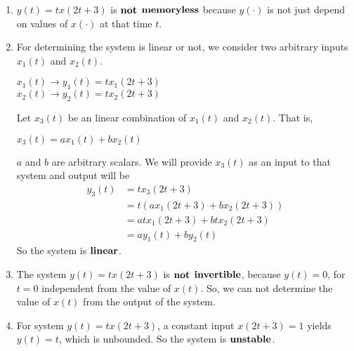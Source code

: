\documentclass[10pt,a4paper, margin=1in]{article}
\begin{document}
\begin{enumerate}
\begin{enumerate}
\begin{enumerate}
        \item
         $y(t)=tx(2t+3)$ is $\bold{not}$ $\bold{memoryless}$ because $y(\cdot)$ is not just depend on values of $x(\cdot)$ at that time $t$. 
         
        \item
        For determining the system is linear or not, we consider two arbitrary inputs $x_1(t)$ and $x_2(t)$.
        \begin{center}
            $x_1(t) \longrightarrow y_1(t) = tx_1(2t+3)$\\
            $x_2(t) \longrightarrow y_2(t) = tx_2(2t+3)$
        \end{center}
        Let $x_3(t)$ be an linear combination of $x_1(t)$ and $x_2(t)$. That is,
        \begin{center}
            $x_3(t) = ax_1(t) + bx_2(t)$  
        \end{center}
        $a$ and $b$ are arbitrary scalars. We will provide $x_3(t)$ as an input to that system and output will be 
        \begin{equation}
            \begin{split}
                y_3(t)  &= tx_3(2t+3)\\
                        &= t(ax_1(2t+3) + bx_2(2t+3)) \\
                        &= atx_1(2t+3) + btx_2(2t+3) \\
                        &= ay_1(t) + by_2(t)
            \end{split}
        \end{equation}
        So the  system is $\bold{linear}$.
        
        \item
        The system $y(t) = tx(2t+3)$ is $\bold{not}$ $\bold{invertible}$, because $y(t) = 0$, for $t=0$ independent from the value of $x(t)$. So, we can not determine the value of $x(t)$ from the output of the system.
        \item
        For system $y(t) = tx(2t+3)$, a constant input $x(2t+3) = 1$ yields $y(t) = t$, which is unbounded. So the system is $\bold{unstable}$. 
        
        
    \end{enumerate}
    \end{enumerate}



\end{enumerate}
\end{document}
